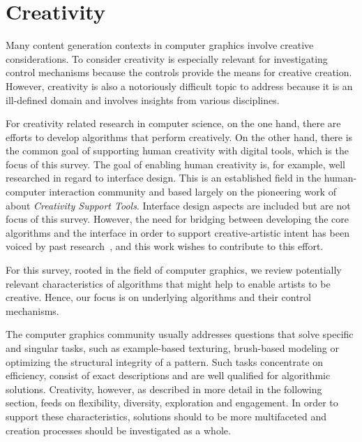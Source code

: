 

\section{Creativity}
\label{sec:creativity}

Many content generation contexts in computer graphics involve creative considerations. To consider creativity is especially relevant for investigating control mechanisms because the controls provide the means for creative creation. However, creativity is also a notoriously difficult topic to address because it is an ill-defined domain and involves insights from various disciplines.


For creativity related research in computer science, on the one hand, there are efforts to develop algorithms that perform creatively. On the other hand, there is the common goal of supporting human creativity with digital tools, which is the focus of this survey. The goal of enabling human creativity is, for example, well researched in regard to interface design. This is an established field in the human-computer interaction community and based largely on the pioneering work of \citeauthor*{shneiderman_2007_cst}~\cite{shneiderman_2007_cst} about \textit{Creativity Support Tools}. Interface design aspects are included but are not focus of this survey. However, the need for bridging between developing the core algorithms and the interface in order to support creative-artistic intent has been voiced by past research~\cite{deterding_2017_mci,isenberg_2016_inw, salesin_2002_nar}, and this work wishes to contribute to this effort.

For this survey, rooted in the field of computer graphics, we review potentially relevant characteristics of algorithms that might help to enable artists to be creative. Hence, our focus is on underlying algorithms and their control mechanisms. 

The computer graphics community usually addresses questions that solve specific and singular tasks, such as example-based texturing, brush-based modeling or optimizing the structural integrity of a pattern. Such tasks concentrate on efficiency, consist of exact descriptions and are well qualified for algorithmic solutions. Creativity, however, as described in more detail in the following section, feeds on flexibility, diversity, exploration and engagement. In order to support these characteristics, solutions should to be more multifaceted and creation processes should be investigated as a whole.

